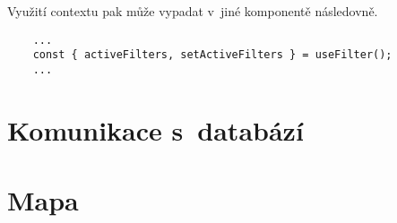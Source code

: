 Využití contextu pak může vypadat v~jiné komponentě následovně.

\begin{verbatim}
    ...
    const { activeFilters, setActiveFilters } = useFilter(); 
    ...
    \end{verbatim}

\hypertarget{komunikace-s-databuxe1zuxed}{%
\section{Komunikace s~databází}\label{komunikace-s-databuxe1zuxed}}

\hypertarget{mapa}{%
\section{Mapa}\label{mapa}}

